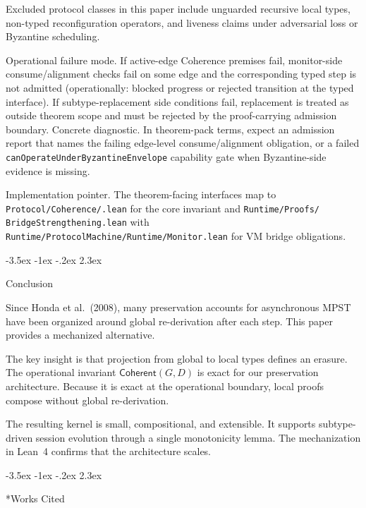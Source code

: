 \documentclass[a4paper,10pt,twocolumn,english]{article}
\makeatletter
\renewcommand{\section}{\@startsection{section}{1}{\z@}%
  {-3.5ex \@plus -1ex \@minus -.2ex}%
  {2.3ex}%
  {\raggedright\normalfont\large\bfseries}}
\numberwithin{equation}{section}
\theoremstyle{paperdef}
\theoremstyle{paperplain}
\theoremstyle{paperdef}
\theoremstyle{paperremark}
\newcommand{\Coherent}{\ensuremath{\mathsf{Coherent}}}
\makeatother
\begin{document}
Excluded protocol classes in this paper include unguarded recursive local types,
non-typed reconfiguration operators, and liveness claims under adversarial loss
or Byzantine scheduling.

Operational failure mode. If active-edge Coherence premises fail, monitor-side
consume/alignment checks fail on some edge and the corresponding typed step is
not admitted (operationally: blocked progress or rejected transition at the
typed interface). If subtype-replacement side conditions fail, replacement is
treated as outside theorem scope and must be rejected by the proof-carrying
admission boundary.
Concrete diagnostic. In theorem-pack terms, expect an admission report that
names the failing edge-level consume/alignment obligation, or a failed
\texttt{canOperateUnderByzantineEnvelope} capability gate when Byzantine-side
evidence is missing.

Implementation pointer. The theorem-facing interfaces map to
\texttt{Protocol/\allowbreak Coherence/\allowbreak *.lean} for the core
invariant and \texttt{Runtime/\allowbreak Proofs/\allowbreak
	BridgeStrengthening.lean} with
\texttt{Runtime/\allowbreak ProtocolMachine/\allowbreak Runtime/\allowbreak Monitor.lean}
for VM bridge obligations.

\section{Conclusion}
\label{sec:conclusion}

Since Honda et al.\ (2008), many preservation accounts for asynchronous MPST have been organized around global re-derivation after each step. This paper provides a mechanized alternative.

The key insight is that projection from global to local types defines an erasure. The operational invariant $\Coherent(G,D)$ is exact for our preservation architecture. Because it is exact at the operational boundary, local proofs compose without global re-derivation.

The resulting kernel is small, compositional, and extensible. It supports subtype-driven session evolution through a single monotonicity lemma. The mechanization in Lean~4 confirms that the architecture scales.

\section*{Works Cited}
\end{document}
